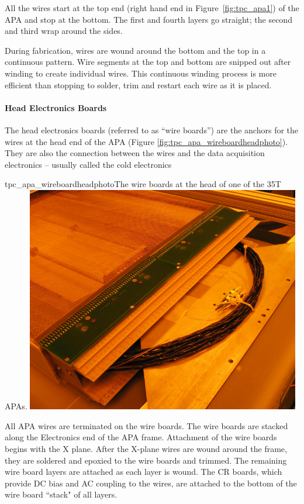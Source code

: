All the wires start at the top end (right hand end in Figure~\ref{fig:tpc_apa1})  of the APA and stop at the bottom. The first and fourth layers go straight; the second and third wrap around the sides. 

During fabrication, wires are wound around the bottom and the top %
in a continuous pattern. Wire segments at the top and bottom are snipped out after winding to create individual wires.  This continuous winding process is more efficient than stopping to solder, trim and restart each wire as it is placed.

\paragraph{Head Electronics Boards}

The head electronics boards (referred to as ``wire boards'') are the anchors for the wires at the head end of the APA (Figure \ref{fig:tpc_apa_wireboardheadphoto}).  They are also the connection between the wires and the data acquisition electronics -- usually called the cold electronics

\begin{cdrfigure}{tpc_apa_wireboardheadphoto}{The wire boards at the head of one of the 35T APAs.}
\includegraphics[width=0.9\textwidth]{figures/tpc_apa_wireboardheadphoto.png} 
\end{cdrfigure}

All APA wires are terminated on the wire boards. The wire boards are stacked along the Electronics end of the APA frame. Attachment of the wire boards begins with the X plane. After the X-plane wires are wound around the frame, they are soldered and epoxied to the wire boards and trimmed. The remaining wire board layers are attached as each layer is wound.  The CR boards, which provide DC bias and AC coupling to the wires, are attached to the bottom of the wire board ``stack" of all layers.


